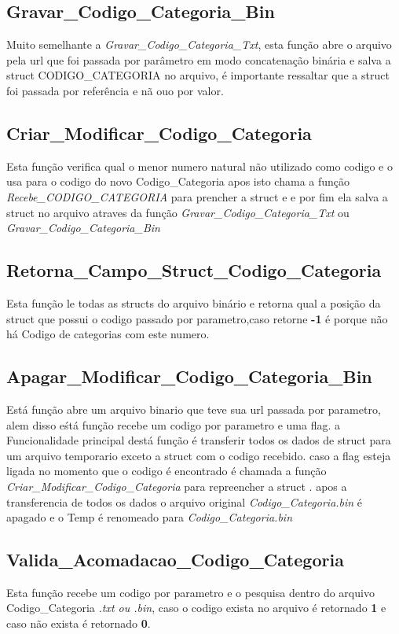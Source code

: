 \documentclass{article}
\begin{document}
\subsection{Gravar\_Codigo\_Categoria\_Bin}
	Muito semelhante a \textit{Gravar\_Codigo\_Categoria\_Txt}, esta função abre o arquivo pela url que foi passada por parâmetro em modo concatenação binária e salva a struct CODIGO\_CATEGORIA  no arquivo, é importante ressaltar que  a struct foi passada por referência e nã ouo por valor.

\subsection{Criar\_Modificar\_Codigo\_Categoria}
	Esta função verifica qual o menor numero natural não utilizado como codigo e o usa para o codigo do novo Codigo\_Categoria apos isto  chama a função \textit{Recebe\_CODIGO\_CATEGORIA} para prencher a struct e e por fim ela salva a struct no arquivo atraves da função \textit{Gravar\_Codigo\_Categoria\_Txt} ou \textit{Gravar\_Codigo\_Categoria\_Bin}

\subsection{Retorna\_Campo\_Struct\_Codigo\_Categoria}
	Esta função le todas as structs do arquivo binário e retorna qual a posição da struct que possui o codigo passado por parametro,caso retorne \textbf{-1} é porque não há Codigo de categorias com este numero.

\subsection{Apagar\_Modificar\_Codigo\_Categoria\_Bin}
	Está função abre um arquivo binario que teve sua  url passada por parametro, alem disso eśtá função recebe um codigo por parametro e uma flag.
	a Funcionalidade principal destá função é transferir todos os dados de struct para um arquivo temporario exceto a struct com o codigo recebido. caso a flag esteja ligada no momento que o codigo é encontrado é chamada a função \textit{Criar\_Modificar\_Codigo\_Categoria} para repreencher a struct . apos a transferencia de todos os dados o arquivo original \textit{Codigo\_Categoria.bin} é apagado e o Temp é renomeado para \textit{Codigo\_Categoria.bin}

\subsection{Valida\_Acomadacao\_Codigo\_Categoria}
	Esta função recebe um codigo por parametro e o pesquisa dentro do arquivo Codigo\_Categoria \textit{.txt ou .bin}, caso o codigo exista no arquivo é retornado \textbf{1} e caso não exista é retornado  \textbf{0}.
\end{document}
